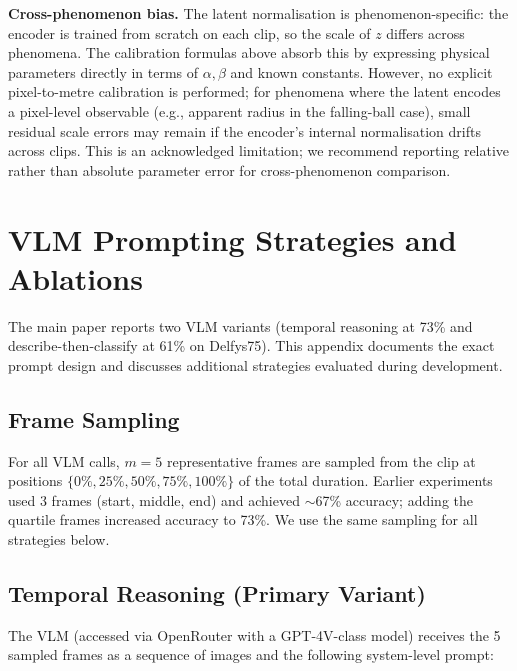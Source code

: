 \documentclass[runningheads]{llncs}
\begin{document}
\textbf{Cross-phenomenon bias.} The latent normalisation is
phenomenon-specific: the encoder is trained from scratch on each clip, so
the scale of $z$ differs across phenomena. The calibration formulas above
absorb this by expressing physical parameters directly in terms of $\alpha,
\beta$ and known constants. However, no explicit pixel-to-metre calibration
is performed; for phenomena where the latent encodes a pixel-level observable
(e.g., apparent radius in the falling-ball case), small residual scale errors
may remain if the encoder's internal normalisation drifts across clips.
This is an acknowledged limitation; we recommend reporting relative rather
than absolute parameter error for cross-phenomenon comparison.


\section{VLM Prompting Strategies and Ablations}
\label{app:vlm_prompting}

The main paper reports two VLM variants (temporal reasoning at 73\% and
describe-then-classify at 61\% on Delfys75). This appendix documents the
exact prompt design and discusses additional strategies evaluated during
development.

\subsection{Frame Sampling}
\label{app:frame_sampling}

For all VLM calls, $m = 5$ representative frames are sampled from the clip
at positions $\{0\%, 25\%, 50\%, 75\%, 100\%\}$ of the total duration.
Earlier experiments used 3 frames (start, middle, end) and achieved $\sim$67\%
accuracy; adding the quartile frames increased accuracy to 73\%.  We use
the same sampling for all strategies below.

\subsection{Temporal Reasoning (Primary Variant)}
\label{app:vlm_temporal}

The VLM (accessed via OpenRouter with a GPT-4V-class model) receives the
5 sampled frames as a sequence of images and the following system-level
prompt:
\end{document}
